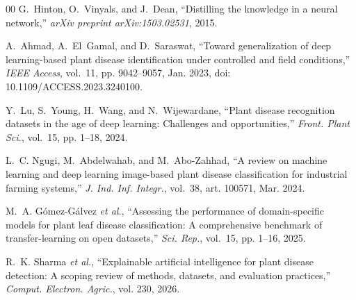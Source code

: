 \documentclass[journal]{IEEEtran}
\begin{document}
\begin{thebibliography}{00}
G.~Hinton, O.~Vinyals, and J.~Dean, ``Distilling the knowledge in a neural network,'' \textit{arXiv preprint arXiv:1503.02531}, 2015.

A.~Ahmad, A.~El~Gamal, and D.~Saraswat, ``Toward generalization of deep learning-based plant disease identification under controlled and field conditions,'' \textit{IEEE Access}, vol.~11, pp. 9042--9057, Jan. 2023, doi: 10.1109/ACCESS.2023.3240100.

Y.~Lu, S.~Young, H.~Wang, and N.~Wijewardane, ``Plant disease recognition datasets in the age of deep learning: Challenges and opportunities,'' \textit{Front. Plant Sci.}, vol.~15, pp. 1--18, 2024.

L.~C. Ngugi, M.~Abdelwahab, and M.~Abo-Zahhad, ``A review on machine learning and deep learning image-based plant disease classification for industrial farming systems,'' \textit{J. Ind. Inf. Integr.}, vol.~38, art. 100571, Mar. 2024.

M.~A. G{\'o}mez-G{\'a}lvez \textit{et al.}, ``Assessing the performance of domain-specific models for plant leaf disease classification: A comprehensive benchmark of transfer-learning on open datasets,'' \textit{Sci. Rep.}, vol.~15, pp. 1--16, 2025.

R.~K. Sharma \textit{et al.}, ``Explainable artificial intelligence for plant disease detection: A scoping review of methods, datasets, and evaluation practices,'' \textit{Comput. Electron. Agric.}, vol. 230, 2026.

\end{thebibliography}
\end{document}
